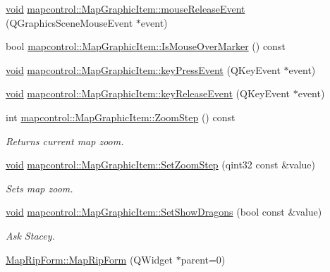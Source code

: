 \begin{DoxyCompactItemize}
\item 
\hyperlink{group___u_a_v_objects_plugin_ga444cf2ff3f0ecbe028adce838d373f5c}{void} \hyperlink{group___o_p_map_widget_gaba0f1f6f68f5a4765b966b704c7efddd}{mapcontrol\-::\-Map\-Graphic\-Item\-::mouse\-Release\-Event} (\-Q\-Graphics\-Scene\-Mouse\-Event $\ast$event)
\item 
bool \hyperlink{group___o_p_map_widget_ga974c2e697780b93234f9001d03d5e89f}{mapcontrol\-::\-Map\-Graphic\-Item\-::\-Is\-Mouse\-Over\-Marker} () const 
\item 
\hyperlink{group___u_a_v_objects_plugin_ga444cf2ff3f0ecbe028adce838d373f5c}{void} \hyperlink{group___o_p_map_widget_ga3c52576f9f0733ac4ea3882ce67a3ee0}{mapcontrol\-::\-Map\-Graphic\-Item\-::key\-Press\-Event} (\-Q\-Key\-Event $\ast$event)
\item 
\hyperlink{group___u_a_v_objects_plugin_ga444cf2ff3f0ecbe028adce838d373f5c}{void} \hyperlink{group___o_p_map_widget_ga2244e13f8bb36fe4230c1776f802e175}{mapcontrol\-::\-Map\-Graphic\-Item\-::key\-Release\-Event} (\-Q\-Key\-Event $\ast$event)
\item 
int \hyperlink{group___o_p_map_widget_gac33e6f99e690bfc9725bbb33b9078d91}{mapcontrol\-::\-Map\-Graphic\-Item\-::\-Zoom\-Step} () const 
\begin{DoxyCompactList}\small\item\em \-Returns current map zoom. \end{DoxyCompactList}\item 
\hyperlink{group___u_a_v_objects_plugin_ga444cf2ff3f0ecbe028adce838d373f5c}{void} \hyperlink{group___o_p_map_widget_ga45d9811a4fc7a2a8c6a677b4501a031d}{mapcontrol\-::\-Map\-Graphic\-Item\-::\-Set\-Zoom\-Step} (qint32 const \&value)
\begin{DoxyCompactList}\small\item\em \-Sets map zoom. \end{DoxyCompactList}\item 
\hyperlink{group___u_a_v_objects_plugin_ga444cf2ff3f0ecbe028adce838d373f5c}{void} \hyperlink{group___o_p_map_widget_gaf6a44ff6d44e64585620480128100737}{mapcontrol\-::\-Map\-Graphic\-Item\-::\-Set\-Show\-Dragons} (bool const \&value)
\begin{DoxyCompactList}\small\item\em \-Ask \-Stacey. \end{DoxyCompactList}\item 
\hyperlink{group___o_p_map_widget_ga992a9478361267f44a0935b7fb7c8476}{\-Map\-Rip\-Form\-::\-Map\-Rip\-Form} (\-Q\-Widget $\ast$parent=0)

\end{DoxyCompactItemize}
